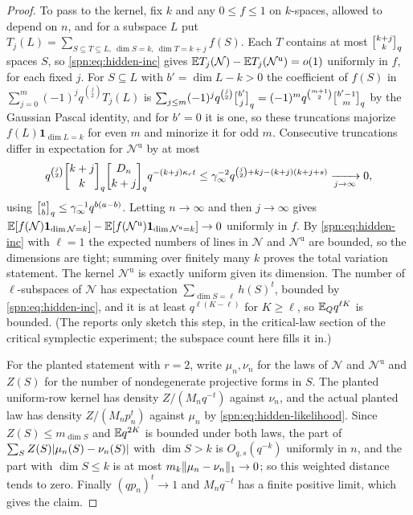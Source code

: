 \begin{proof}
To pass to the kernel, fix $k$ and any $0\le f\le1$ on $k$-spaces, allowed to depend on $n$, and for
a subspace $L$ put $T_j(L)=\sum_{S\subseteq T\subseteq L,\ \dim S=k,\ \dim T=k+j}f(S)$. Each $T$
contains at most $\spnqbin{k+j}{k}{q}$ spaces $S$, so \eqref{spn:eq:hidden-inc} gives
$\mathbb{E} T_j(\mathcal N)-\mathbb{E} T_j(\mathcal N^{\mathrm u})=o(1)$ uniformly in $f$, for each fixed $j$.
For $S\subseteq L$ with $b'=\dim L-k>0$ the coefficient of $f(S)$ in
$\sum_{j=0}^m(-1)^jq^{\binom j2}T_j(L)$ is $\sum_{j\le m}(-1)^jq^{\binom j2}\spnqbin{b'}{j}{q}=
(-1)^mq^{\binom{m+1}2}\spnqbin{b'-1}{m}{q}$ by the Gaussian Pascal identity, and for $b'=0$ it is one,
so these truncations majorize $f(L)\mathbf 1_{\dim L=k}$ for even $m$ and minorize it for odd $m$.
Consecutive truncations differ in expectation for $\mathcal N^{\mathrm u}$ by at most
\[
 q^{\binom j2}\spnqbin{k+j}{k}{q}\spnqbin{D_n}{k+j}{q}q^{-(k+j)\kappa_rt}\le
 \gamma_\infty^{-2}q^{\binom j2+kj-(k+j)(k+j+s)}\xrightarrow[j\to\infty]{}0,
\]
using $\spnqbin ab{q}\le\gamma_\infty^{-1}q^{b(a-b)}$. Letting $n\to\infty$ and then $j\to\infty$
gives $\mathbb{E}[f(\mathcal N)\mathbf 1_{\dim\mathcal N=k}]-\mathbb{E}[f(\mathcal N^{\mathrm u})\mathbf
1_{\dim\mathcal N^{\mathrm u}=k}]\to0$ uniformly in $f$. By \eqref{spn:eq:hidden-inc} with $\ell=1$
the expected numbers of lines in $\mathcal N$ and $\mathcal N^{\mathrm u}$ are bounded, so the
dimensions are tight; summing over finitely many $k$ proves the total variation statement. The
kernel $\mathcal N^{\mathrm u}$ is exactly uniform given its dimension. The number of
$\ell$-subspaces of $\mathcal N$ has expectation $\sum_{\dim S=\ell}h(S)^t$, bounded by
\eqref{spn:eq:hidden-inc}, and it is at least $q^{\ell(K-\ell)}$ for $K\ge\ell$, so
$\mathbb{E}_Qq^{\ell K}$ is bounded. (The reports only sketch this step, in the critical-law section of
the critical symplectic experiment; the subspace count here fills it in.)

For the planted statement with $r=2$, write $\mu_n,\nu_n$ for the laws of $\mathcal N$ and
$\mathcal N^{\mathrm u}$ and $Z(S)$ for the number of nondegenerate projective forms in $S$. The
planted uniform-row kernel has density $Z/(M_nq^{-t})$ against $\nu_n$, and the actual planted law
has density $Z/(M_np_n^t)$ against $\mu_n$ by \eqref{spn:eq:hidden-likelihood}. Since
$Z(S)\le m_{\dim S}$ and $\mathbb{E} q^{2K}$ is bounded under both laws, the part of
$\sum_SZ(S)\lvert\mu_n(S)-\nu_n(S)\rvert$ with $\dim S>k$ is $O_{q,s}(q^{-k})$ uniformly in $n$, and the part
with $\dim S\le k$ is at most $m_k\lVert\mu_n-\nu_n\rVert_1\to0$; so this weighted distance tends to zero.
Finally $(qp_n)^t\to1$ and $M_nq^{-t}$ has a finite positive limit, which gives the claim.
\end{proof}

